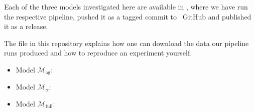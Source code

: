 \begin{tcolorbox}[
    title=\faIcon{recycle} Reproducibility,
    parbox=false,
    float
]
    Each of the three models investigated here are available in , where we have run the respective pipeline, pushed it as a tagged commit to ~GitHub and published it as a release.

    The  file in this repository explains how one can download the data our pipeline runs produced and how to reproduce an experiment yourself.

    \begin{itemize}
        \item Model $\mathcal{M}_\text{ag}$: 
        \item Model $\mathcal{M}_\alpha$: 
        \item Model $\mathcal{M}_\text{full}$: 
    \end{itemize}
\end{tcolorbox}
